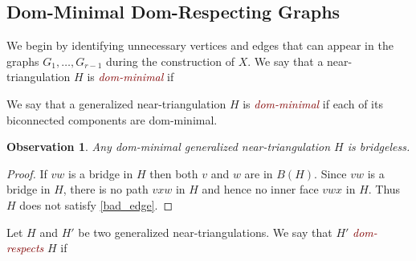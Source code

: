 \documentclass{article}
\newcommand{\pat}[1]{\textcolor{red}{PM: #1}}
\newtheorem{obs}{Observation}
\newcommand{\defin}[1]{\emph{\textcolor{Maroon}{#1}}}
\theoremstyle{definition}
\begin{document}


\subsection{Dom-Minimal Dom-Respecting Graphs}

We begin by identifying unnecessary vertices and edges that can appear in the graphs $G_1,\ldots,G_{r-1}$ during the construction of $X$.   We say that a near-triangulation $H$ is \defin{dom-minimal} if
We say that a generalized near-triangulation $H$ is \defin{dom-minimal} if each of its biconnected components are dom-minimal.

\begin{obs}\label{bridgeless}
    Any dom-minimal generalized near-triangulation $H$ is bridgeless.
\end{obs}

\begin{proof}
   If $vw$ is a bridge in $H$ then both $v$ and $w$ are in $B(H)$.  Since $vw$ is a bridge in $H$, there is no path $vxw$ in $H$ and hence no inner face $vwx$ in $H$. Thus $H$ does not satisfy \cref{bad_edge}.
\end{proof}

Let $H$ and $H'$ be two generalized near-triangulations.  We say that $H'$ \defin{dom-respects} $H$ if
\end{document}
